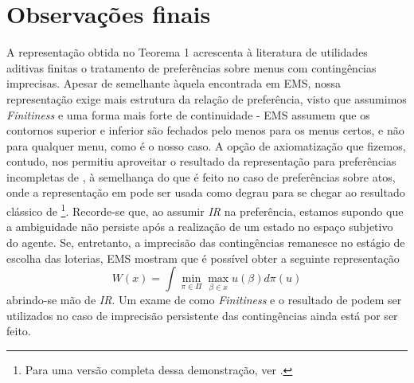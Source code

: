 \documentclass[11pt, a4paper]{article}
\theoremstyle{nonumberplain}
\theoremstyle{plain}
\theoremstyle{plain}
\theoremstyle{plain}
\theoremstyle{nonumberplain}
\begin{document}
\section{Observações finais}
A representação obtida no Teorema 1 acrescenta à literatura de utilidades aditivas finitas o tratamento de preferências sobre menus com contingências imprecisas. Apesar de semelhante àquela encontrada em EMS, nossa representação exige mais estrutura da relação de preferência, visto que assumimos \emph{Finitiness} e uma forma mais forte de continuidade - EMS assumem que os contornos superior e inferior são fechados pelo menos para os menus certos, e não para qualquer menu, como é o nosso caso. A opção de axiomatização que fizemos, contudo, nos permitiu aproveitar o resultado da representação para preferências incompletas de \cite{Kochov2007}, à semelhança do que é feito no caso de preferências sobre atos, onde a representação em \cite{Bewley1986a} pode ser usada como degrau para se chegar ao resultado clássico de \cite{Gilboa1989}\footnote{Para uma versão completa dessa demonstração, ver \cite{Riella2014}.}.
Recorde-se que, ao assumir \emph{IR} na preferência, estamos supondo que a ambiguidade não persiste após a realização de um estado no espaço subjetivo do agente. Se, entretanto, a imprecisão das contingências remanesce no estágio de escolha das loterias, EMS mostram que é possível obter a seguinte representação
$$W(x)=\int \min_{\pi\in\Pi} \max_{\beta\in x}u(\beta)d\pi(u) $$
abrindo-se mão de \emph{IR}. Um exame de como \emph{Finitiness} e o resultado de \cite{Kochov2007} podem ser utilizados no caso de imprecisão persistente das contingências ainda está por ser feito.
\clearpage


\end{document}
